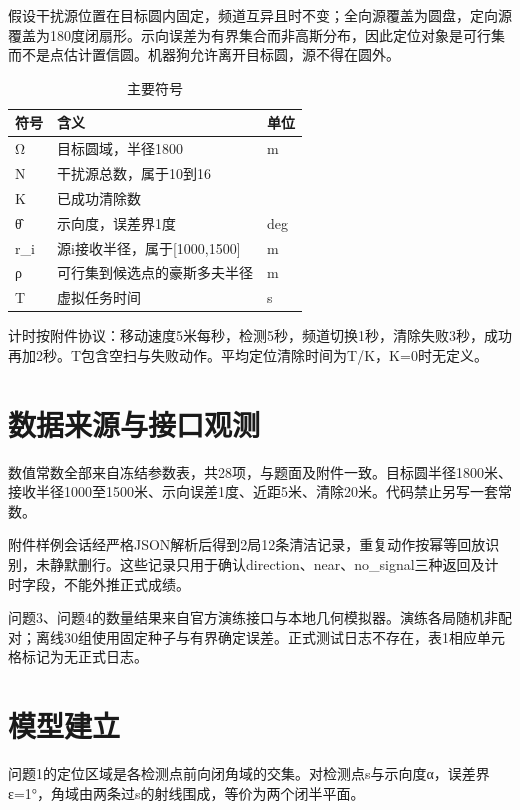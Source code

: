 \documentclass[UTF8,12pt,a4paper,fontset=none]{ctexart}
\begin{document}
假设干扰源位置在目标圆内固定，频道互异且时不变；全向源覆盖为圆盘，定向源覆盖为180度闭扇形。示向误差为有界集合而非高斯分布，因此定位对象是可行集而不是点估计置信圆。机器狗允许离开目标圆，源不得在圆外。

\begin{table}[!htbp]
  \centering
  \caption{主要符号}
  \label{tab-symbols}
  \begin{tabularx}{\textwidth}{>{\centering\arraybackslash}X>{\centering\arraybackslash}X>{\centering\arraybackslash}X}
    \toprule
    符号 & 含义 & 单位 \\
    \midrule
    Ω & 目标圆域，半径1800 & m \\
N & 干扰源总数，属于10到16 & 1 \\
K & 已成功清除数 & 1 \\
θ̂ & 示向度，误差界1度 & deg \\
r\_i & 源i接收半径，属于[1000,1500] & m \\
ρ & 可行集到候选点的豪斯多夫半径 & m \\
T & 虚拟任务时间 & s \\
    \bottomrule
  \end{tabularx}
\end{table}

计时按附件协议：移动速度5米每秒，检测5秒，频道切换1秒，清除失败3秒，成功再加2秒。T包含空扫与失败动作。平均定位清除时间为T/K，K=0时无定义。

\section{数据来源与接口观测}

数值常数全部来自冻结参数表，共28项，与题面及附件一致。目标圆半径1800米、接收半径1000至1500米、示向误差1度、近距5米、清除20米。代码禁止另写一套常数。

附件样例会话经严格JSON解析后得到2局12条清洁记录，重复动作按幂等回放识别，未静默删行。这些记录只用于确认direction、near、no\_signal三种返回及计时字段，不能外推正式成绩。

问题3、问题4的数量结果来自官方演练接口与本地几何模拟器。演练各局随机非配对；离线30组使用固定种子与有界确定误差。正式测试日志不存在，表1相应单元格标记为无正式日志。

\section{模型建立}

问题1的定位区域是各检测点前向闭角域的交集。对检测点s与示向度α，误差界ε=1°，角域由两条过s的射线围成，等价为两个闭半平面。
\end{document}

